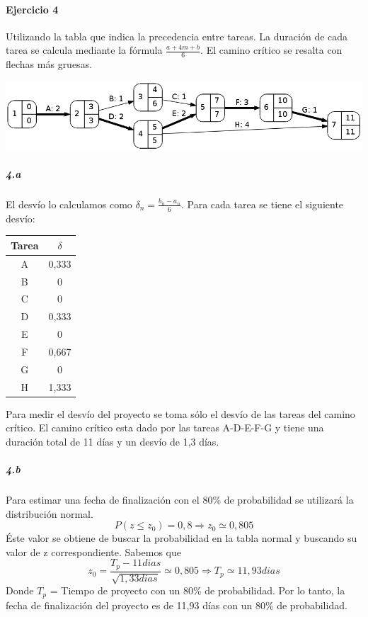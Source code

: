 \documentclass[a4paper,10pt]{article}
\begin{document}
  
  
\paragraph{Ejercicio 4} Utilizando la tabla que indica la precedencia entre tareas. La duración de cada tarea se calcula mediante la fórmula $\frac{a + 4m + b}{6}$. El camino crítico se resalta con flechas más gruesas.
   \begin{center}
    \includegraphics[scale=0.5,keepaspectratio=true]{img/ej4-1.png} 
  \end{center}
  
  \subparagraph {4.a} El desvío lo calculamos como $\delta_n = \frac{b_n - a_n}{6}$. Para cada tarea se tiene el siguiente desvío:
  \begin{center}
   \begin{tabular}{|| c | c ||}
   \hline 
      Tarea & $\delta$ \\ \hline \hline
      A & 0,333\\ \hline
      B & 0\\ \hline
      C & 0\\ \hline
      D & 0,333\\ \hline
      E & 0\\ \hline
      F & 0,667\\ \hline
      G & 0\\ \hline
      H & 1,333\\ \hline 
      
   \end{tabular}
   \end{center}
  Para medir el desvío del proyecto se toma sólo el desvío de las tareas del camino crítico.
  El camino crítico esta dado por las tareas A-D-E-F-G y tiene una duración total de 11 días y un desvío de 1,3 días. 
  
  \subparagraph {4.b} Para estimar una fecha de finalización con el 80\% de probabilidad se utilizará la distribución normal. 
  $$ P(z \leq z_0) = 0,8 \Rightarrow z_0 \simeq 0,805$$
  Éste valor se obtiene de buscar la probabilidad en la tabla normal y buscando su valor de z correspondiente. Sabemos que 
  $$ z_0 = \frac{T_p - 11dias}{\sqrt{1,33dias}} \simeq 0,805 \Rightarrow T_p \simeq 11,93 dias $$
  Donde $T_p$ = Tiempo de proyecto con un 80\% de probabilidad.
  Por lo tanto, la fecha de finalización del proyecto es de 11,93 días con un 80\% de probabilidad.
  
\end{document}
